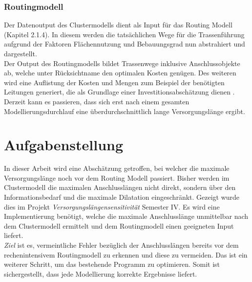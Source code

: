 \subsubsection{Routingmodell}


Der Datenoutput des Clustermodells dient als Input für das Routing Modell (Kapitel 2.1.4). In diesem werden die tatsächlichen Wege für die Trassenführung
aufgrund der Faktoren Flächennutzung und Bebauungsgrad nun abstrahiert und dargestellt.
\\
Der Output des Routingmodells bildet Trassenwege inklusive Anschlussobjekte ab, welche unter Rücksichtname den optimalen Kosten genügen.
Des weiteren wird eine Auflistung der Kosten und Mengen zum Beispiel der benötigten Leitungen generiert, die als Grundlage einer Investitionsabschätzung dienen
\cite{pinkafeld1}.
\\
Derzeit kann es passieren, dass sich erst nach einem gesamten Modellierungsdurchlauf eine überdurchschnittlich lange Versorgungslänge ergibt. 
 


\section{Aufgabenstellung}
\label{sec:1einleitung}


\vspace{0.5cm}

In dieser Arbeit wird  eine Abschätzung getroffen,  bei welcher die maximale Versorgungslänge noch vor dem Routing Modell passiert. 
Bisher werden im Clustermodell die maximalen Anschlusslängen nicht direkt, sondern über den Informationsbedarf und die maximale Dilatation eingeschränkt.
Gezeigt wurde dies im Projekt \textit{Versorgungslängensensitivität} Semester IV.
Es wird eine Implementierung benötigt, welche die maximale Anschlusslänge unmittelbar nach dem Clustermodell ermittelt und dem Routingmodell einen
geeigneten Input liefert. 
\\
\textit{Ziel} ist es, vermeintliche Fehler bezüglich der Anschlusslängen bereits vor dem rechenintensivem Routingmodell zu erkennen und diese zu vermeiden.
 Das ist ein weiterer Schritt, um das bestehende Programm zu optimieren.
Somit ist sichergestellt, dass jede Modellierung korrekte Ergebnisse liefert.

